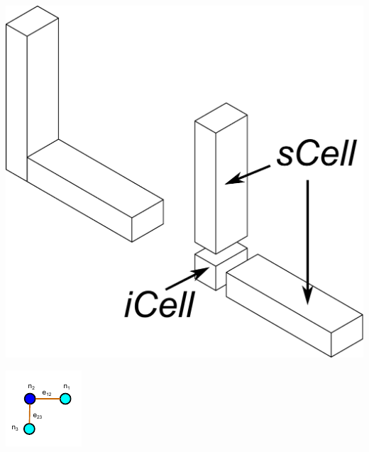 \begin{minipage}[h]{0.9\linewidth} 
\begin{minipage}[h]{0.2\linewidth} 
\includegraphics[width=\linewidth]{../Common/images/CellDecompExample.pdf}
\label{fig_celldecomp3d}
\end{minipage}
\hfill
\begin{minipage}[h]{0.2\linewidth} 
\includegraphics[width=\linewidth]{../Common/images/FeatureInteractionGraph.pdf}

\end{minipage}
\end{minipage}
